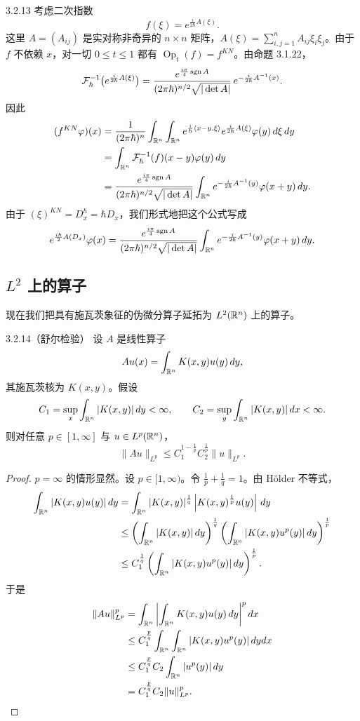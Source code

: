 \begin{example}{3.2.13}
考虑二次指数
\[
f(\xi)=e^{\frac{i}{2\hbar}A(\xi)}.
\]
这里 $A=(A_{ij})$ 是实对称非奇异的 $n\times n$ 矩阵，$A(\xi)=\sum_{i,j=1}^nA_{ij}\xi_i\xi_j$。由于 $f$ 不依赖 $x$，对一切 $0\le t\le1$ 都有 $\operatorname{Op}_t(f)=f^{KN}$。由命题 3.1.22，
\[
\mathcal{F}_\hbar^{-1}\bigl(e^{\frac{i}{2\hbar}A(\xi)}\bigr)
=\frac{e^{\frac{i\pi}{4}\operatorname{sgn} A}}{(2\pi\hbar)^{n/2}\sqrt{|\det A|}}\,e^{-\frac{i}{2\hbar}A^{-1}(x)}.
\]
因此
\begin{align*}
(f^{KN}\varphi)(x)
&=\frac{1}{(2\pi\hbar)^n}\int_{\mathbb{R}^n}\int_{\mathbb{R}^n}e^{\frac i\hbar\langle x-y,\xi\rangle}e^{\frac{i}{2\hbar}A(\xi)}\varphi(y)\,d\xi\,dy\\
&=\int_{\mathbb{R}^n}\mathcal{F}_\hbar^{-1}(f)(x-y)\varphi(y)\,dy\\
&=\frac{e^{\frac{i\pi}{4}\operatorname{sgn} A}}{(2\pi\hbar)^{n/2}\sqrt{|\det A|}}\int_{\mathbb{R}^n}e^{-\frac{i}{2\hbar}A^{-1}(y)}\varphi(x+y)\,dy.
\end{align*}
由于 $(\xi)^{KN}=D^\hbar_{x}=\hbar D_{x}$，我们形式地把这个公式写成
\[
e^{\frac{i\hbar}{2}A(D_{x})}\varphi(x)
=\frac{e^{\frac{i\pi}{4}\operatorname{sgn} A}}{(2\pi\hbar)^{n/2}\sqrt{|\det A|}}\int_{\mathbb{R}^n}e^{-\frac{i}{2\hbar}A^{-1}(y)}\varphi(x+y)\,dy.
\]
\end{example}


\subsection{$L^2$ 上的算子}

现在我们把具有施瓦茨象征的伪微分算子延拓为 $L^2(\mathbb{R}^n)$ 上的算子。

\begin{lemma}{3.2.14}（舒尔检验）
设 $A$ 是线性算子
\[
Au(x)=\int_{\mathbb{R}^n}K(x,y)u(y)\,dy,
\]
其施瓦茨核为 $K(x,y)$。假设
\[
C_1=\sup_{x}\int_{\mathbb{R}^n}|K(x,y)|\,dy<\infty,\qquad
C_2=\sup_{y}\int_{\mathbb{R}^n}|K(x,y)|\,dx<\infty.
\]
则对任意 $p\in[1,\infty]$ 与 $u\in L^p(\mathbb{R}^n)$，
\[
\|Au\|_{L^p}\le C_1^{1-\frac1p}C_2^{\frac1p}\|u\|_{L^p}.
\]
\end{lemma}

\begin{proof}
$p=\infty$ 的情形显然。设 $p\in[1,\infty)$。令 $\frac1p+\frac1q=1$。由 Hölder 不等式，
\begin{align*}
\int_{\mathbb{R}^n}|K(x,y)u(y)|\,dy
&=\int_{\mathbb{R}^n}|K(x,y)|^{\frac1q}\left|K(x,y)^{\frac1p}u(y)\right|\,dy\\
&\le\left(\int_{\mathbb{R}^n}|K(x,y)|\,dy\right)^{\frac1q}
\left(\int_{\mathbb{R}^n}|K(x,y)u^p(y)|\,dy\right)^{\frac1p}\\
&\le C_1^{\frac1q}\left(\int_{\mathbb{R}^n}|K(x,y)u^p(y)|\,dy\right)^{\frac1p}.
\end{align*}
于是
\begin{align*}
\|Au\|_{L^p}^p
&=\int_{\mathbb{R}^n}\left|\int_{\mathbb{R}^n}K(x,y)u(y)\,dy\right|^p dx\\
&\le C_1^{\frac pq}\int_{\mathbb{R}^n}\int_{\mathbb{R}^n}|K(x,y)u^p(y)|\,dydx\\
&\le C_1^{\frac pq}C_2\int_{\mathbb{R}^n}|u^p(y)|\,dy\\
&=C_1^{\frac pq}C_2\|u\|_{L^p}^p.
\end{align*}
\end{proof}

